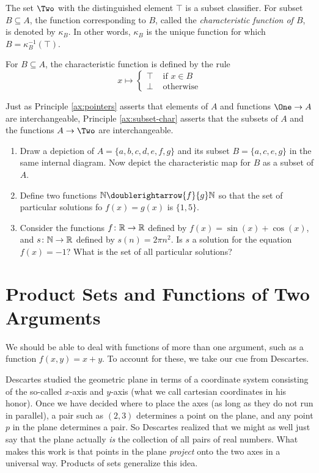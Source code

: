\begin{principle}\label{ax:subset-char}
	The set $\Two$ with the distinguished element $\top$ is a subset classifier.
	For subset $B\subseteq A$, the function corresponding to $B$, called the \emph{characteristic function of $B$}, is denoted by $\kappa_B$.
	In other words, $\kappa_B$ is the unique function for which $B = \kappa_B^{-1}(\top)$.

	For $B\subseteq A$, the characteristic function is defined by the rule
	\[
	x \mapsto
		\begin{cases}
			\top &\text{ if } x\in B\\
			\bot &\text{ otherwise}
		\end{cases}
	\]
\end{principle}

Just as Principle \ref{ax:pointers} asserts that elements of $A$ and functions $\One\to A$ are interchangeable, Principle \ref{ax:subset-char} asserts that the subsets of $A$ and the functions $A\to\Two$ are interchangeable.

\begin{exercises}
	\begin{enumerate}
	\item Draw a depiction of $A=\{a,b,c,d,e,f,g\}$ and its subset $B=\{a,c,e,g\}$ in the same internal diagram. Now depict the characteristic map for $B$ as a subset of $A$.
	
	\item Define two functions $\NN\doublerightarrow{f}{g}\NN$ so that the set of particular solutions fo $f(x)=g(x)$ is $\{1,5\}$. 
	
	\item Consider the functions ${f}\colon{\mathbb R}\to{\mathbb R}$ defined by $f(x) = \sin(x) + \cos(x)$, and ${s}\colon{\mathbb N}\to{\mathbb R}$ defined by $s(n) = 2\pi n^2$. 
	Is $s$ a solution for the equation $f(x) = -1$? 
	What is the set of all particular solutions?
	\end{enumerate}
		
\end{exercises}

\section{Product Sets and Functions of Two Arguments}

We should be able to deal with functions of more than one argument, such as a function $f(x,y) = x+y$.
To account for these, we take our cue from Descartes.

Descartes studied the geometric plane in terms of a coordinate system consisting of the so-called $x$-axis and $y$-axis (what we call cartesian coordinates in his honor).
Once we have decided where to place the axes (as long as they do not run in parallel), a pair such as $(2,3)$ determines a point on the plane, and any point $p$ in the plane determines a pair.
So Descartes realized that we might as well just say that the plane actually \emph{is} the collection of all pairs of real numbers.
What makes this work is that points in the plane \emph{project} onto the two axes in a universal way.
Products of sets generalize this idea.

